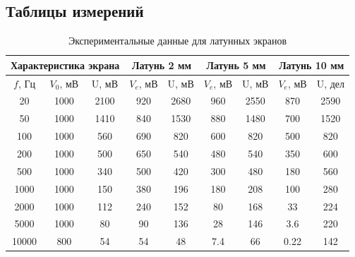 \subsection{Таблицы измерений}
\begin{table}[H]
	\centering
	\begin{tabular}{|c|c|c|c|c|c|c|c|c|}
	\hline
	\multicolumn{3}{|c|}{Характеристика экрана}& \multicolumn{2}{c|}{Латунь 2 мм} & \multicolumn{2}{c|}{Латунь 5 мм} & \multicolumn{2}{c|}{Латунь 10 мм} \\ \hline
	\multicolumn{1}{|c|}{$f$, Гц} & \multicolumn{1}{c|}{$V_0$, мВ} & \multicolumn{1}{c|}{U, мВ} &	\multicolumn{1}{c|}{$V_e$, мВ}&U, мВ  & $V_e$, мВ &U, мВ&$V_e$, мВ&U, дел\\
	\hline
	20   &1000&2100&920&2680&960&2550&870  &2590\\ \hline
	50   &1000&1410&840&1530&880&1480&700  &1520\\ \hline
	100  &1000&560 &690&820 &600&820 &500  &820\\ \hline
	200  &1000&500 &650&540 &480&540 &350  &600\\ \hline
	500  &1000&340 &500&420 &300&480 &180  &560\\ \hline
	1000 &1000&150 &380&196 &180&208 &100  &280\\ \hline
	2000 &1000&112 &240&152 &80 &168 &33   &224\\ \hline
	5000 &1000&80  &90 &136 &28 &146 &3.6  &220\\ \hline
	10000&800 &54   &54 &48  &7.4&66 &0.22 &142\\ \hline
	\end{tabular}
	\caption{Экспериментальные данные для латунных экранов}
	\label{tab:lead}
\end{table}

